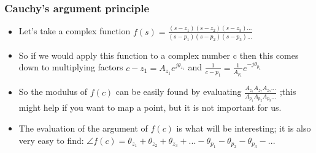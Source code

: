 %
%
%
\begin{frame}
\frametitle{Cauchy’s argument principle}
\begin{itemize}
\item Let’s take a complex function $f(s)=\frac{(s-z_1)(s-z_2)(s-z_3)...}{(s-p_1)(s-p_2)(s-p_3)...}$ 
\item So if we would apply this function to a complex number c then this comes down to multiplying factors $ c-z_1 = A_{z_1}e^{j\theta_{z_1}}$ and $\frac {1}{c-p_1} = \frac{1}{A_{p_1}}e^{-j\theta_{p_1}} $ 
\item So the modulus of $f(c)$ can be easily found by evaluating $\frac{A_{z_1}A_{z_2}A_{z_3}...}{A_{p_1}A_{p_2}A_{p_3}...}$ ;this might help if you want to map a point, but it is not important for us.
\item The evaluation of the argument of $f(c)$ is what will be interesting; it is also very easy to find: $ \angle f(c) = \theta_{z_1} + \theta_{z_2}+\theta_{z_3}+...-\theta_{p_1} - \theta_{p_2} - \theta_{p_3}-... $ 
\end{itemize}
\end{frame}


